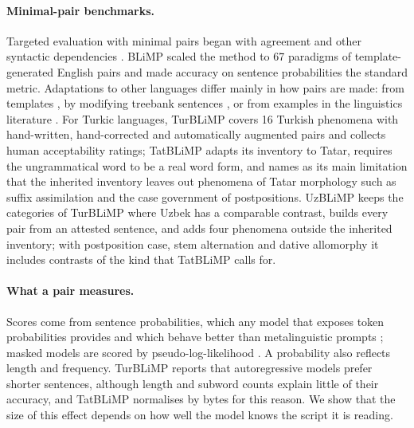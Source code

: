 \documentclass[11pt]{article}
\begin{document}
\paragraph{Minimal-pair benchmarks.} Targeted evaluation with minimal pairs began with agreement and other syntactic dependencies \citep{linzen-etal-2016-assessing,marvin-linzen-2018-targeted,mueller-etal-2020-cross}. BLiMP \citep{warstadt-etal-2020-blimp} scaled the method to 67 paradigms of template-generated English pairs and made accuracy on sentence probabilities the standard metric. Adaptations to other languages differ mainly in how pairs are made: from templates \citep{xiang-etal-2021-climp,liu-etal-2024-zhoblimp,suijkerbuijk-etal-2025-blimp}, by modifying treebank sentences \citep{song-etal-2022-sling,taktasheva-etal-2024-rublimp,jumelet2025multiblimp}, or from examples in the linguistics literature \citep{someya-oseki-2023-jblimp}. For Turkic languages, TurBLiMP \citep{basar2025turblimp} covers 16 Turkish phenomena with hand-written, hand-corrected and automatically augmented pairs and collects human acceptability ratings; TatBLiMP \citep{saetov2026tatblimp} adapts its inventory to Tatar, requires the ungrammatical word to be a real word form, and names as its main limitation that the inherited inventory leaves out phenomena of Tatar morphology such as suffix assimilation and the case government of postpositions. UzBLiMP keeps the categories of TurBLiMP where Uzbek has a comparable contrast, builds every pair from an attested sentence, and adds four phenomena outside the inherited inventory; with postposition case, stem alternation and dative allomorphy it includes contrasts of the kind that TatBLiMP calls for.

\paragraph{What a pair measures.} Scores come from sentence probabilities, which any model that exposes token probabilities provides and which behave better than metalinguistic prompts \citep{lau-etal-2017-grammaticality,hu-levy-2023-prompting}; masked models are scored by pseudo-log-likelihood \citep{salazar-etal-2020-masked,kauf-ivanova-2023-better}. A probability also reflects length and frequency. TurBLiMP reports that autoregressive models prefer shorter sentences, although length and subword counts explain little of their accuracy, and TatBLiMP normalises by bytes for this reason. We show that the size of this effect depends on how well the model knows the script it is reading.
\end{document}
